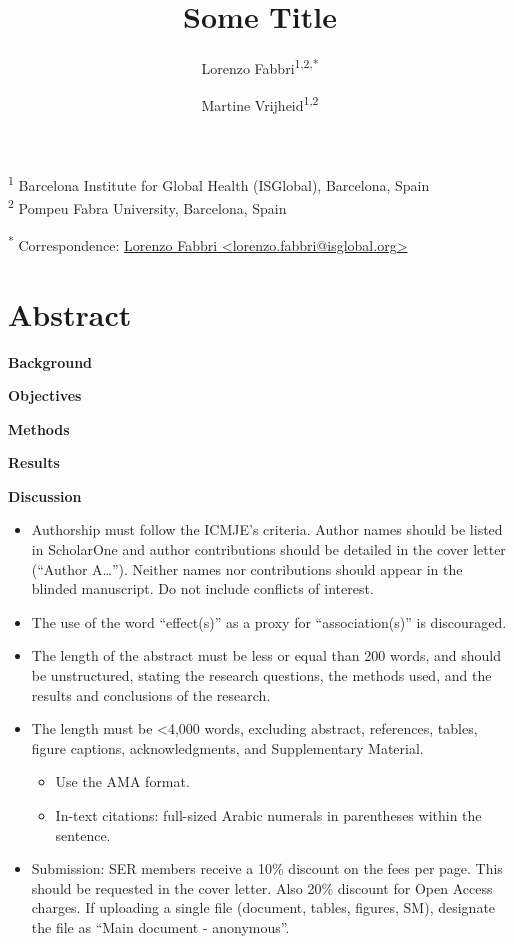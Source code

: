 \documentclass[
  letterpaper,
  DIV=11,
  numbers=noendperiod]{scrartcl}
\title{Some Title}
\author{Lorenzo Fabbri\textsuperscript{1,2,*} \and Martine
Vrijheid\textsuperscript{1,2}}
\date{}
\providecommand{\tightlist}{%
  \setlength{\itemsep}{0pt}\setlength{\parskip}{0pt}}\usepackage{longtable,booktabs,array}
\begin{document}
\maketitle
\linenumbers

\textsuperscript{1} Barcelona Institute for Global Health (ISGlobal),
Barcelona, Spain\\
\textsuperscript{2} Pompeu Fabra University, Barcelona, Spain

\textsuperscript{*} Correspondence:
\href{mailto:lorenzo.fabbri@isglobal.org}{Lorenzo Fabbri
\textless{}lorenzo.fabbri@isglobal.org\textgreater{}}

\section*{Abstract}\label{abstract}

\textbf{Background}

\textbf{Objectives}

\textbf{Methods}

\textbf{Results}

\textbf{Discussion}

\newpage

\begin{itemize}
\tightlist
\item
  Authorship must follow the ICMJE's criteria. Author names should be
  listed in ScholarOne and author contributions should be detailed in
  the cover letter (``Author A\ldots{}''). Neither names nor
  contributions should appear in the blinded manuscript. Do not include
  conflicts of interest.
\item
  The use of the word ``effect(s)'' as a proxy for ``association(s)'' is
  discouraged.
\item
  The length of the abstract must be less or equal than 200 words, and
  should be unstructured, stating the research questions, the methods
  used, and the results and conclusions of the research.
\item
  The length must be \textless4,000 words, excluding abstract,
  references, tables, figure captions, acknowledgments, and
  Supplementary Material.

  \begin{itemize}
  \tightlist
  \item
    Use the AMA format.
  \item
    In-text citations: full-sized Arabic numerals in parentheses within
    the sentence.
  \end{itemize}
\item
  Submission: SER members receive a 10\% discount on the fees per page.
  This should be requested in the cover letter. Also 20\% discount for
  Open Access charges. If uploading a single file (document, tables,
  figures, SM), designate the file as ``Main document - anonymous''.
\end{itemize}
\end{document}
